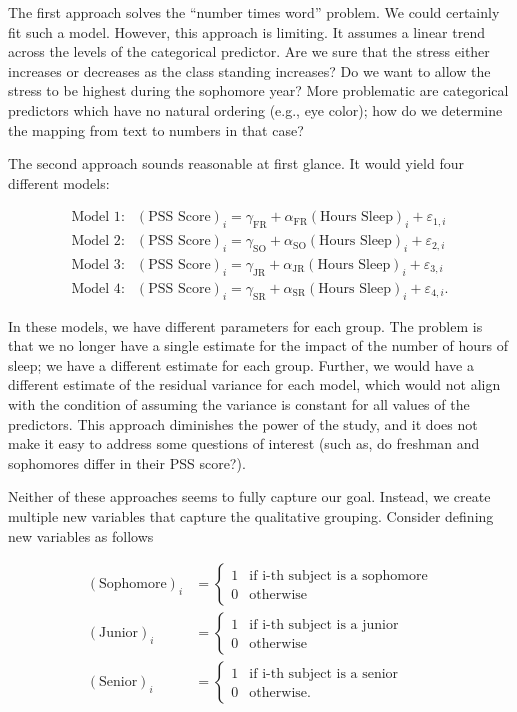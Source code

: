 \documentclass[
  letterpaper,
  DIV=11,
  numbers=noendperiod]{scrreprt}
\theoremstyle{definition}
\theoremstyle{definition}
\theoremstyle{remark}
\begin{document}
The first approach solves the ``number times word'' problem. We could
certainly fit such a model. However, this approach is limiting. It
assumes a linear trend across the levels of the categorical predictor.
Are we sure that the stress either increases or decreases as the class
standing increases? Do we want to allow the stress to be highest during
the sophomore year? More problematic are categorical predictors which
have no natural ordering (e.g., eye color); how do we determine the
mapping from text to numbers in that case?

The second approach sounds reasonable at first glance. It would yield
four different models:

\[
\begin{aligned}
  \text{Model 1}:& (\text{PSS Score})_i = \gamma_{\text{FR}} + 
    \alpha_{\text{FR}} (\text{Hours Sleep})_i + \varepsilon_{1,i} \\
  \text{Model 2}:& (\text{PSS Score})_i = \gamma_{\text{SO}} + 
    \alpha_{\text{SO}} (\text{Hours Sleep})_i + \varepsilon_{2,i} \\
  \text{Model 3}:& (\text{PSS Score})_i = \gamma_{\text{JR}} + 
    \alpha_{\text{JR}} (\text{Hours Sleep})_i + \varepsilon_{3,i} \\
  \text{Model 4}:& (\text{PSS Score})_i = \gamma_{\text{SR}} + 
    \alpha_{\text{SR}} (\text{Hours Sleep})_i + \varepsilon_{4,i}.
\end{aligned}
\]

In these models, we have different parameters for each group. The
problem is that we no longer have a single estimate for the impact of
the number of hours of sleep; we have a different estimate for each
group. Further, we would have a different estimate of the residual
variance for each model, which would not align with the condition of
assuming the variance is constant for all values of the predictors. This
approach diminishes the power of the study, and it does not make it easy
to address some questions of interest (such as, do freshman and
sophomores differ in their PSS score?).

Neither of these approaches seems to fully capture our goal. Instead, we
create multiple new variables that capture the qualitative grouping.
Consider defining new variables as follows

\[
\begin{aligned}
  (\text{Sophomore})_i &= \begin{cases}
    1 & \text{if i-th subject is a sophomore} \\
    0 & \text{otherwise}
    \end{cases} \\
  (\text{Junior})_i &= \begin{cases}
    1 & \text{if i-th subject is a junior} \\
    0 & \text{otherwise}
    \end{cases} \\
  (\text{Senior})_i &= \begin{cases}
    1 & \text{if i-th subject is a senior} \\
    0 & \text{otherwise.}
    \end{cases}
\end{aligned}
\]
\end{document}
